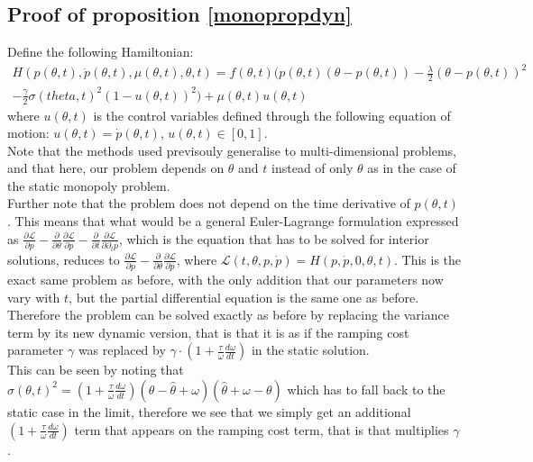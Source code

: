 \begin{subappendices}
\section{Proof of proposition \ref{monopropdyn}}\label{monopdyn_proof}

Define the following Hamiltonian: 
\begin{equation}
\begin{split}
H(p(\theta,t),\dot{p}(\theta,t),\mu(\theta,t),\theta,t)= f(\theta,t)\bigg( p(\theta,t)(\theta-p(\theta,t))-\frac{\lambda}{2}(\theta-p(\theta,t))^2\\
-\frac{\gamma}{2}\sigma(theta,t)^2\left(1-u(\theta,t)\right)^2\bigg)+\mu(\theta,t) u(\theta,t)
\end{split}
\end{equation}
where $u(\theta,t)$ is the control variables defined through the following equation of motion: $u(\theta,t)=\dot{p}(\theta,t)$, $u(\theta,t)\in[0,1]$. \\

Note that the methods used previsouly generalise to multi-dimensional problems, and that here, our problem depends on $\theta$ and $t$ instead of only $\theta$ as in the case of the static monopoly problem. \\

Further note that the problem does not depend on the time derivative of $p(\theta,t)$. This means that what would be a general Euler-Lagrange formulation expressed as $\frac{\partial\mathcal{L}}{\partial p} - \frac{\partial}{\partial \theta}\frac{\partial \mathcal{L}}{\partial \dot{p}} - \frac{\partial}{\partial t}\frac{\partial \mathcal{L}}{\partial \partial_t p}$, which is the equation that has to be solved for interior solutions, reduces to  $\frac{\partial\mathcal{L}}{\partial p} - \frac{\partial}{\partial \theta}\frac{\partial \mathcal{L}}{\partial \dot{p}}$, where  $\mathcal{L}(t,\theta,p,\dot{p}) = H(p,\dot{p},0,\theta,t)$. This is the exact same problem as before, with the only addition that our parameters now vary with $t$, but the partial differential equation is the same one as before. \\

Therefore the problem can be solved exactly as before by replacing the variance term by its new dynamic version, that is that it is as if the ramping cost parameter $\gamma$ was replaced by $\gamma \cdot \left( 1+ \frac{\tau}{\omega}\frac{d\omega}{dt}\right)$ in the static solution.\\

This can be seen by noting that $\sigma(\theta,t)^2 = \left(1+\frac{\tau}{\omega}\frac{d\omega}{dt}\right)(\theta-\hat{\theta}+\omega)(\hat{\theta}+\omega-\theta)$ which has to fall back to the static case in the limit, therefore we see that we simply get an additional $\left(1+\frac{\tau}{\omega}\frac{d\omega}{dt}\right)$ term that appears on the ramping cost term, that is that multiplies $\gamma$.


\end{subappendices}
